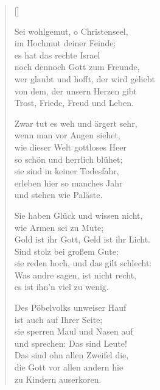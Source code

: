 \begin{multicols}{2}
\settowidth{\versewidth}{ein frommer Mensch, der nicht geschwebt}
\begin{verse}[\versewidth]

 Sei wohlgemut, o Christenseel,\\
im Hochmut deiner Feinde;\\
es hat das rechte Israel\\
noch dennoch Gott zum Freunde,\\
wer glaubt und hofft, der wird geliebt\\
von dem, der unsern Herzen gibt\\
Trost, Friede, Freud und Leben.

 Zwar tut es weh und ärgert sehr,\\
wenn man vor Augen siehet,\\
wie dieser Welt gottloses Heer\\
so schön und herrlich blühet;\\
sie sind in keiner Todesfahr,\\
erleben hier so manches Jahr\\
und stehen wie Paläste.

 Sie haben Glück und wissen nicht,\\
wie Armen sei zu Mute;\\
Gold ist ihr Gott, Geld ist ihr Licht.\\
Sind stolz bei großem Gute;\\
sie reden hoch, und das gilt schlecht:\\
Was andre sagen, ist nicht recht,\\
es ist ihn'n viel zu wenig.

 Des Pöbelvolks unweiser Hauf\\
ist auch auf Ihrer Seite;\\
sie sperren Maul und Nasen auf\\
und sprechen: Das sind Leute!\\
Das sind ohn allen Zweifel die,\\
die Gott vor allen andern hie\\
zu Kindern auserkoren.


\end{verse}
\end{multicols}
